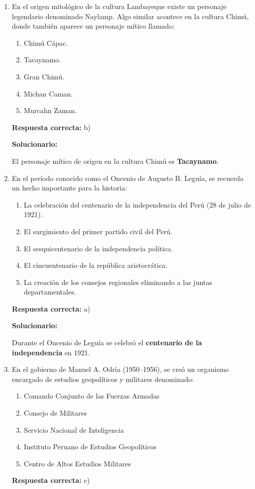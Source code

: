 \begin{enumerate}[resume]

	
	\item En el origen mitológico de la cultura Lambayeque existe un personaje legendario denominado Naylamp. Algo similar acontece en la cultura Chimú, donde también aparece un personaje mítico llamado:
	\begin{enumerate}[label=\alph*)]
		\item Chimú Cápac.
		\item Tacaynamo.
		\item Gran Chimú.
		\item Michan Caman.
		\item Murcahn Zaman.
	\end{enumerate}
	\textbf{Respuesta correcta:} b)
	
	\vspace{2mm}
	\textbf{Solucionario:}
	
	El personaje mítico de origen en la cultura Chimú es \textbf{Tacaynamo}.
	

	
	\vspace{6mm}
	
	\item En el período conocido como el Oncenio de Augusto B. Leguía, se recuerda un hecho importante para la historia:
	\begin{enumerate}[label=\alph*)]
		\item La celebración del centenario de la independencia del Perú (28 de julio de 1921).
		\item El surgimiento del primer partido civil del Perú.
		\item El sesquicentenario de la independencia política.
		\item El cincuentenario de la república aristocrática.
		\item La creación de los consejos regionales eliminando a las juntas departamentales.
	\end{enumerate}
	\textbf{Respuesta correcta:} a)
	
	\vspace{2mm}
	\textbf{Solucionario:}
	
	Durante el Oncenio de Leguía se celebró el \textbf{centenario de la independencia} en 1921.
	

	
	\vspace{6mm}
	
	\item En el gobierno de Manuel A. Odría (1950--1956), se creó un organismo encargado de estudios geopolíticos y militares denominado:
	\begin{enumerate}[label=\alph*)]
		\item Comando Conjunto de las Fuerzas Armadas
		\item Consejo de Militares
		\item Servicio Nacional de Inteligencia
		\item Instituto Peruano de Estudios Geopolíticos
		\item Centro de Altos Estudios Militares
	\end{enumerate}
	\textbf{Respuesta correcta:} e)
	

\end{enumerate}
